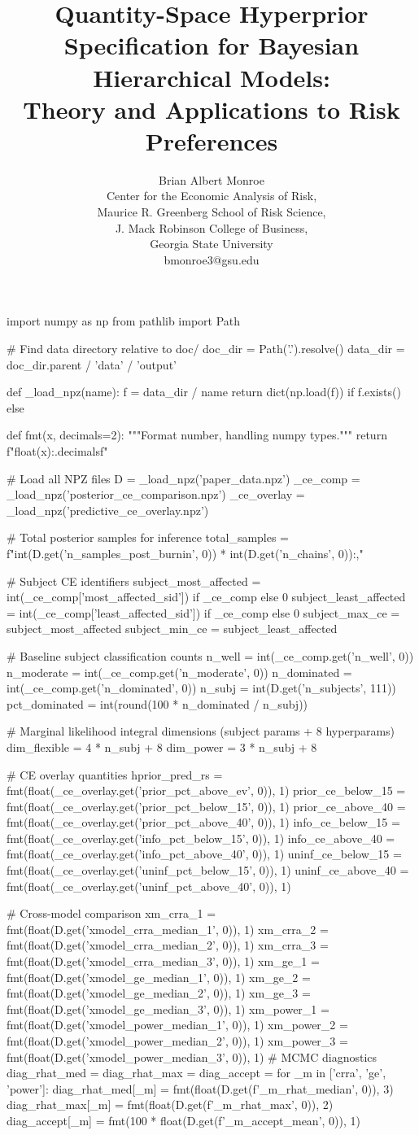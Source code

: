 \documentclass[12pt,a4paper]{article}
\title{Quantity-Space Hyperprior Specification for Bayesian Hierarchical Models:\\
Theory and Applications to Risk Preferences}
\author{
	Brian Albert Monroe\\
    \small{Center for the Economic Analysis of Risk, }\\
    \small{Maurice R. Greenberg School of Risk Science,}\\
    \small{J. Mack Robinson College of Business,}\\
    \small{Georgia State University}\\
		\small{bmonroe3@gsu.edu}}
\theoremstyle{definition}
\theoremstyle{remark}
\begin{document}
\begin{pycode}
import numpy as np
from pathlib import Path

# Find data directory relative to doc/
doc_dir = Path('.').resolve()
data_dir = doc_dir.parent / 'data' / 'output'

def _load_npz(name):
    f = data_dir / name
    return dict(np.load(f)) if f.exists() else {}

def fmt(x, decimals=2):
    """Format number, handling numpy types."""
    return f"{float(x):.{decimals}f}"

# Load all NPZ files
D = _load_npz('paper_data.npz')
_ce_comp = _load_npz('posterior_ce_comparison.npz')
_ce_overlay = _load_npz('predictive_ce_overlay.npz')

# Total posterior samples for inference
total_samples = f"{int(D.get('n_samples_post_burnin', 0)) * int(D.get('n_chains', 0)):,}"

# Subject CE identifiers
subject_most_affected = int(_ce_comp['most_affected_sid']) if _ce_comp else 0
subject_least_affected = int(_ce_comp['least_affected_sid']) if _ce_comp else 0
subject_max_ce = subject_most_affected
subject_min_ce = subject_least_affected

# Baseline subject classification counts
n_well = int(_ce_comp.get('n_well', 0))
n_moderate = int(_ce_comp.get('n_moderate', 0))
n_dominated = int(_ce_comp.get('n_dominated', 0))
n_subj = int(D.get('n_subjects', 111))
pct_dominated = int(round(100 * n_dominated / n_subj))

# Marginal likelihood integral dimensions (subject params + 8 hyperparams)
dim_flexible = 4 * n_subj + 8
dim_power = 3 * n_subj + 8

# CE overlay quantities
hprior_pred_rs = fmt(float(_ce_overlay.get('prior_pct_above_ev', 0)), 1)
prior_ce_below_15 = fmt(float(_ce_overlay.get('prior_pct_below_15', 0)), 1)
prior_ce_above_40 = fmt(float(_ce_overlay.get('prior_pct_above_40', 0)), 1)
info_ce_below_15 = fmt(float(_ce_overlay.get('info_pct_below_15', 0)), 1)
info_ce_above_40 = fmt(float(_ce_overlay.get('info_pct_above_40', 0)), 1)
uninf_ce_below_15 = fmt(float(_ce_overlay.get('uninf_pct_below_15', 0)), 1)
uninf_ce_above_40 = fmt(float(_ce_overlay.get('uninf_pct_above_40', 0)), 1)

# Cross-model comparison
xm_crra_1 = fmt(float(D.get('xmodel_crra_median_1', 0)), 1)
xm_crra_2 = fmt(float(D.get('xmodel_crra_median_2', 0)), 1)
xm_crra_3 = fmt(float(D.get('xmodel_crra_median_3', 0)), 1)
xm_ge_1 = fmt(float(D.get('xmodel_ge_median_1', 0)), 1)
xm_ge_2 = fmt(float(D.get('xmodel_ge_median_2', 0)), 1)
xm_ge_3 = fmt(float(D.get('xmodel_ge_median_3', 0)), 1)
xm_power_1 = fmt(float(D.get('xmodel_power_median_1', 0)), 1)
xm_power_2 = fmt(float(D.get('xmodel_power_median_2', 0)), 1)
xm_power_3 = fmt(float(D.get('xmodel_power_median_3', 0)), 1)
# MCMC diagnostics
diag_rhat_med = {}
diag_rhat_max = {}
diag_accept = {}
for _m in ['crra', 'ge', 'power']:
    diag_rhat_med[_m] = fmt(float(D.get(f'{_m}_rhat_median', 0)), 3)
    diag_rhat_max[_m] = fmt(float(D.get(f'{_m}_rhat_max', 0)), 2)
    diag_accept[_m] = fmt(100 * float(D.get(f'{_m}_accept_mean', 0)), 1)

\end{pycode}
\end{document}

